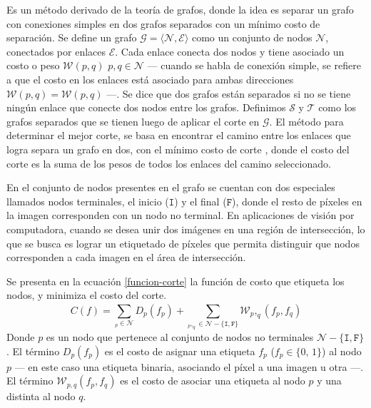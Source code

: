 Es un método derivado de la teoría de grafos, donde la idea es separar un grafo con conexiones simples en dos grafos separados con un mínimo costo de separación. Se define un grafo $\mathcal{G} = \langle \mathcal{N}, \mathcal{E} \rangle$ como un conjunto de nodos $\mathcal{N}$, conectados por enlaces $\mathcal{E}$. Cada enlace conecta dos nodos y tiene asociado un costo o peso $\mathcal{W}(p, q) \,\, p,q \in \mathcal{N}$ --- cuando se habla de conexión simple, se refiere a que el costo en los enlaces está asociado para ambas direcciones $\mathcal{W}(p, q) = \mathcal{W}(p, q)$ ---. Se dice que dos grafos están separados si no se tiene ningún enlace que conecte dos nodos entre los grafos. Definimos $\mathcal{S}$ y $\mathcal{T}$ como los grafos separados que se tienen luego de aplicar el corte en $\mathcal{G}$. El método para determinar el mejor corte, se basa en encontrar el camino entre los enlaces que logra separa un grafo en dos, con el mínimo costo de corte \cite{graph-cut}, donde el costo del corte es la suma de los pesos de todos los enlaces del camino seleccionado.

En el conjunto de nodos presentes en el grafo se cuentan con dos especiales llamados nodos terminales, el inicio ($\mathtt{I}$) y el final ($\mathtt{F}$), donde el resto de píxeles en la imagen corresponden con un nodo no terminal. En aplicaciones de visión por computadora, cuando se desea unir dos imágenes en una región de intersección, lo que se busca es lograr un etiquetado de píxeles que permita distinguir que nodos corresponden a cada imagen en el área de intersección.

Se presenta en la ecuación \ref{funcion-corte} la función de costo que etiqueta los nodos, y minimiza el costo del corte.
\begin{equation}
C(f) = \sum_{_p\in \mathcal{N}}^{} D_p(f_p) + \sum_{_p,_q \in \mathcal{N} - \{\mathtt{I},\mathtt{F}\}}^{} \mathcal{W}_p,_q (f_p, f_q)
\label{funcion-corte}
\end{equation}
Donde $p$ es un nodo que pertenece al conjunto de nodos no terminales $\mathcal{N} - \{\mathtt{I},\mathtt{F}\}$. El término $D_p(f_p)$ es el costo de asignar una etiqueta $f_p$ ($f_p \in \{0,\,1\}$) al nodo $p$ --- en este caso una etiqueta binaria, asociando el píxel a una imagen u otra ---. El término $\mathcal{W}_{p,q} (f_p, f_q)$ es el costo de asociar una etiqueta al nodo $p$ y una distinta al nodo $q$.

